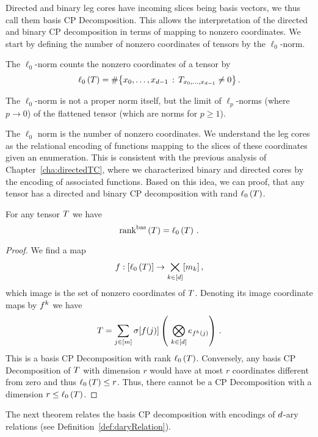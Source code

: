Directed and binary leg cores have incoming slices being basis vectors, we thus call them basis CP Decomposition.
This allows the interpretation of the directed and binary CP decomposition in terms of mapping to nonzero coordinates.
We start by defining the number of nonzero coordinates of tensors by the $\ell_0$-norm.

\begin{definition}
	The $\ell_0$-norm counts the nonzero coordinates of a tensor by
		\[ \ell_0\left(T\right) = \#\big\{ x_{0},\ldots,x_{d-1} \, : \, T_{x_{0},\ldots,x_{d-1} }\neq 0 \big\} \, . \]
\end{definition}

The $\ell_0$-norm is not a proper norm itself, but the limit of $\ell_p$-norms (where $p \rightarrow 0$) of the flattened tensor (which are norms for $p\geq1$).

The $\ell_0$ norm is the number of nonzero coordinates. 
We understand the leg cores as the relational encoding of functions mapping to the slices of these coordinates given an enumeration.
This is consistent with the previous analysis of Chapter~\ref{cha:directedTC}, where we characterized binary and directed cores by the encoding of associated functions.
Based on this idea, we can proof, that any tensor has a directed and binary CP decomposition with rand $\ell_0\left(T\right)$.


\begin{theorem}\label{the:sparseBasisCP}
	For any tensor $T$ we have
		\[ \mathrm{rank}^{\mathrm{bas}}\left(T\right) = \ell_0\left(T\right) \, .  \]	
\end{theorem}
\begin{proof}
	We find a map 
		\[ f : [\ell_0\left(T\right)] \rightarrow  \bigtimes_{k\in[d]}[m_{k}] \, , \] 
	which image is the set of nonzero coordinates of $T$.
	Denoting its image coordinate maps by $f^{k}$ we have
		\[ \hypercore = \sum_{\dataindexin} \scalarcoreof{\exfunction(\dataindex)} \left( \bigotimes_{\atomenumeratorin} \onehotmapof{\exfunction^\atomenumerator(\dataindex)} \right) \, . \]
	This is a basis CP Decomposition with rank $\ell_0\left(T\right)$.
	Conversely, any basis CP Decomposition of $T$ with dimension $r$ would have at most $r$ coordinates different from zero and thus $\ell_0\left(T\right)\leq r$.
	Thus, there cannot be a CP Decomposition with a dimension $r\leq\ell_0\left(T\right)$.
\end{proof}

%
The next theorem relates the basis CP decomposition with encodings of $d$-ary relations (see Definition~\ref{def:daryRelation}).

